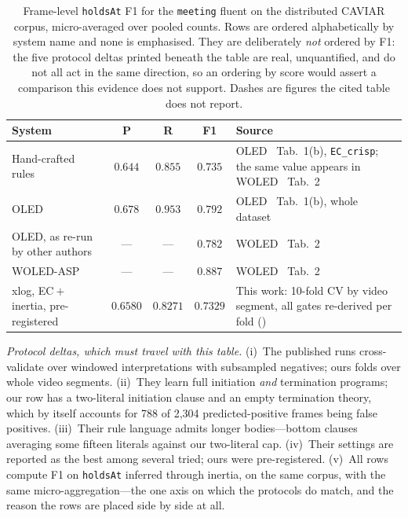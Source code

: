 \begin{table}[htbp]
  \centering
  \caption{Frame-level \texttt{holdsAt} F1 for the \texttt{meeting} fluent on the distributed CAVIAR corpus, micro-averaged over pooled counts. Rows are ordered alphabetically by system name and none is emphasised. They are deliberately \emph{not} ordered by F1: the five protocol deltas printed beneath the table are real, unquantified, and do not all act in the same direction, so an ordering by score would assert a comparison this evidence does not support. Dashes are figures the cited table does not report.}
  \label{tab:ec-published}
  \small
  \begin{tabularx}{\linewidth}{@{}l c c c L@{}}
    \toprule
    \textbf{System} & \textbf{P} & \textbf{R} & \textbf{F1} & \textbf{Source} \\
    \midrule
    Hand-crafted rules                      & $0.644$  & $0.855$  & $0.735$  & OLED~\cite{oled} Tab.~1(b), \texttt{EC\_crisp}; the same value appears in WOLED~\cite{woled} Tab.~2 \\
    OLED                                    & $0.678$  & $0.953$  & $0.792$  & OLED~\cite{oled} Tab.~1(b), whole dataset \\
    OLED, as re-run by other authors        & ---      & ---      & $0.782$  & WOLED~\cite{woled} Tab.~2 \\
    WOLED-ASP                               & ---      & ---      & $0.887$  & WOLED~\cite{woled} Tab.~2 \\
    xlog, EC${}+{}$inertia, pre-registered  & $0.6580$ & $0.8271$ & $0.7329$ & This work: 10-fold CV by video segment, all gates re-derived per fold () \\
    \bottomrule
  \end{tabularx}

  \vspace{0.5em}
  {\footnotesize\raggedright
  \emph{Protocol deltas, which must travel with this table.}
  (i)~The published runs cross-validate over windowed interpretations with subsampled negatives; ours folds over whole video segments.
  (ii)~They learn full initiation \emph{and} termination programs; our row has a two-literal initiation clause and an empty termination theory, which by itself accounts for 788 of 2{,}304 predicted-positive frames being false positives.
  (iii)~Their rule language admits longer bodies---bottom clauses averaging some fifteen literals against our two-literal cap.
  (iv)~Their settings are reported as the best among several tried; ours were pre-registered.
  (v)~All rows compute F1 on \texttt{holdsAt} inferred through inertia, on the same corpus, with the same micro-aggregation---the one axis on which the protocols do match, and the reason the rows are placed side by side at all.\par}
\end{table}

